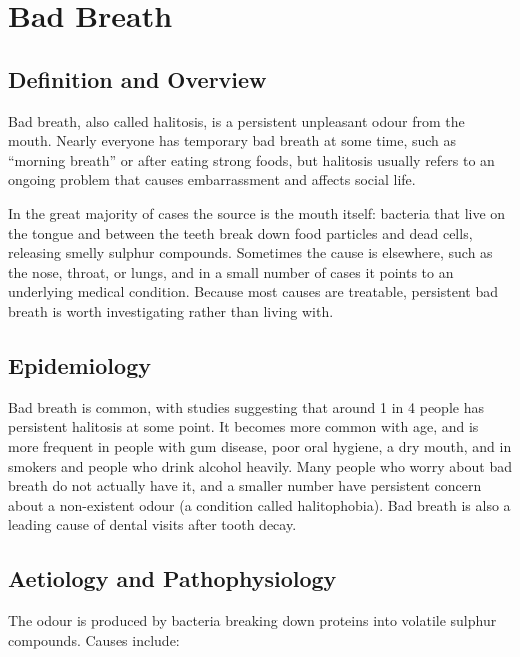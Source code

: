 \chapter{Bad Breath}

\section*{Definition and Overview}
Bad breath, also called halitosis, is a persistent unpleasant odour from the mouth. Nearly everyone has temporary bad breath at some time, such as ``morning breath'' or after eating strong foods, but halitosis usually refers to an ongoing problem that causes embarrassment and affects social life.

In the great majority of cases the source is the mouth itself: bacteria that live on the tongue and between the teeth break down food particles and dead cells, releasing smelly sulphur compounds. Sometimes the cause is elsewhere, such as the nose, throat, or lungs, and in a small number of cases it points to an underlying medical condition. Because most causes are treatable, persistent bad breath is worth investigating rather than living with.

\section*{Epidemiology}
Bad breath is common, with studies suggesting that around 1 in 4 people has persistent halitosis at some point. It becomes more common with age, and is more frequent in people with gum disease, poor oral hygiene, a dry mouth, and in smokers and people who drink alcohol heavily. Many people who worry about bad breath do not actually have it, and a smaller number have persistent concern about a non-existent odour (a condition called halitophobia). Bad breath is also a leading cause of dental visits after tooth decay.

\section*{Aetiology and Pathophysiology}
The odour is produced by bacteria breaking down proteins into volatile sulphur compounds. Causes include:

